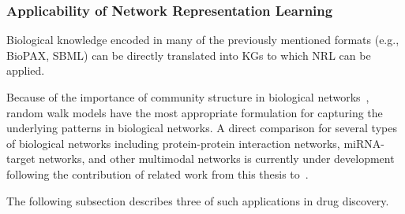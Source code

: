 \subsubsection{Applicability of Network Representation Learning}

Biological knowledge encoded in many of the previously mentioned formats (e.g., \ac{BioPAX}, \ac{SBML}) can be directly translated into \acp{KG} to which \ac{NRL} can be applied.

Because of the importance of community structure in biological networks~\cite{Girvan2002}, random walk models have the most appropriate formulation for capturing the underlying patterns in biological networks.
A direct comparison for several types of biological networks including protein-protein interaction networks, miRNA-target networks, and other multimodal networks is currently under development following the contribution of related work from this thesis to~\cite{Ali2019}.

The following subsection describes three of such applications in drug discovery.
